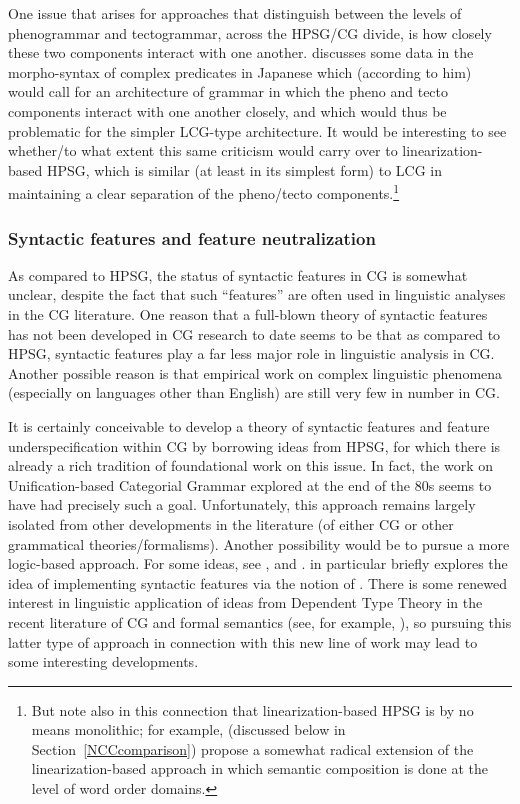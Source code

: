 \documentclass[output=paper
                ,modfonts
                ,nonflat
	        ,collection
	        ,collectionchapter
	        ,collectiontoclongg
 	        ,biblatex
                ,babelshorthands
                ,newtxmath
                ,draftmode
                ,colorlinks, citecolor=brown
]{./langsci/langscibook}
\begin{document}
One issue that arises for approaches that distinguish between the
levels of phenogrammar and tectogrammar, across the HPSG/CG divide, is
how closely these two components interact with one another.
\citet{Kubota2014a-u} discusses some data in the morpho-syntax of
complex predicates in Japanese which (according to him) would call for
an architecture of grammar in which the pheno and tecto components
interact with one another closely, and which would thus be problematic
for the simpler LCG-type architecture. It would be interesting to see
whether/to what extent this same criticism would carry over to
linearization-based HPSG, which is similar (at least in its simplest
form) to LCG in maintaining a clear separation of the pheno/tecto
components.\footnote{But note also in this connection that
linearization-based HPSG is by no means monolithic; for example,
\citet{yatabe-tam2017} (discussed below in
Section~\ref{NCCcomparison}) propose a somewhat radical extension of
the linearization-based approach in which semantic composition is done at
the level of word order domains.}


\subsubsection{Syntactic features and feature neutralization}

As compared to HPSG, the status of syntactic features in CG is
somewhat unclear, despite the fact that such ``features'' are often used
in linguistic analyses in the CG literature. One reason that a
full-blown theory of syntactic features has not been developed in CG
research to date seems to be that as compared to HPSG, syntactic
features play a far less major role in linguistic analysis in CG.
Another possible reason is that empirical work on complex linguistic
phenomena (especially on languages other than English) are still very
few in number in CG. 

It is certainly conceivable to develop a theory of syntactic features
and feature underspecification within CG by borrowing ideas from HPSG,
for which there is already a rich tradition of foundational work on this
issue. In fact, the work on Unification-based Categorial Grammar
\citep{CalderEA1988} explored at the end of the 80s seems to have had
precisely such a goal. Unfortunately, this approach remains largely
isolated from other developments in the literature (of either CG or
other grammatical theories/formalisms). Another possibility would be to pursue a
more logic-based approach. For some ideas, see \citet{BJ95},
\citet{Bayer96}
and \citet{Morrill94a-u}. \citet{Morrill94a-u} in particular briefly
explores the idea of implementing syntactic features via the notion of
. There is some renewed interest in
linguistic application of ideas from Dependent
Type Theory \citep{MartinLofIntuitionistic} in the recent literature
of CG and formal semantics (see, for example,
\citealt{ChatzikyriakidisLuo2017}), so pursuing this latter type of
approach in connection with this new line of work may lead to some
interesting developments.
\end{document}
